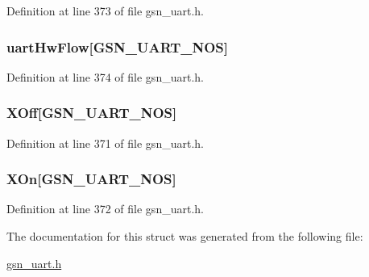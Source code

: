 Definition at line 373 of file gsn\_\-uart.h.

\hypertarget{a00264_a6a20be3b2209f1ff645260a6a36910c1}{
\subsubsection[{uartHwFlow}]{ {\bf uartHwFlow}\mbox{[}GSN\_\-UART\_\-NOS\mbox{]}}}
\label{a00264_a6a20be3b2209f1ff645260a6a36910c1}


Definition at line 374 of file gsn\_\-uart.h.

\hypertarget{a00264_a6923b1711832ca57f94d65ee00851907}{
\subsubsection[{XOff}]{ {\bf XOff}\mbox{[}GSN\_\-UART\_\-NOS\mbox{]}}}
\label{a00264_a6923b1711832ca57f94d65ee00851907}


Definition at line 371 of file gsn\_\-uart.h.

\hypertarget{a00264_a20339b5ed2ceeb35592446e561d1f642}{
\subsubsection[{XOn}]{ {\bf XOn}\mbox{[}GSN\_\-UART\_\-NOS\mbox{]}}}
\label{a00264_a20339b5ed2ceeb35592446e561d1f642}


Definition at line 372 of file gsn\_\-uart.h.



The documentation for this struct was generated from the following file:\begin{DoxyCompactItemize}
\item 
\hyperlink{a00600}{gsn\_\-uart.h}\end{DoxyCompactItemize}
